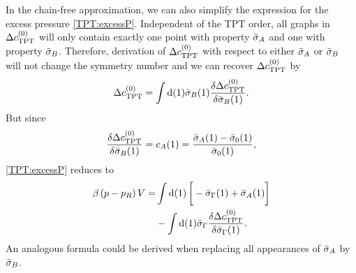 \documentclass[8.5pt,twoside,twocolumn]{article}
\newcommand\di{\te{d}}
\newcommand\inon{\enmat{\int\di(1)}}
\theoremstyle{standard}
\begin{document}
In the chain-free approximation, we can also simplify the expression for the
excess pressure \eqref{TPT:excessP}. Independent of the TPT order, all graphs in
$\Delta c^{(0)}_{\text{TPT}}$ will only contain exactly one point with property $\bar\sigma_A$ and one with
property $\bar\sigma_B$. Therefore, derivation of $\Delta c^{(0)}_{\text{TPT}}$ with respect to either $\bar\sigma_A$
or $\bar\sigma_B$ will not change the symmetry number and we can recover $\Delta c^{(0)}_{\text{TPT}}$ by
\begin{equation}
\dct=\inon \si_B(1) \delti{\dct}{\si_B(1)}.
\label{TPT:dctbyint}
\end{equation}
But since
\begin{equation}
\frac {\delta{\ensuremath{\Delta c^{(0)}}_{\text{TPT}}}} {\delta{\bar\sigma_B(1)}}=c_A(1)=\frac{\bar\sigma_A(1)-\bar\sigma_0(1)}{\bar\sigma_0(1)},
\label{TPT:dctbycA}
\end{equation}
\eqref{TPT:excessP} reduces to
\begin{equation}
\begin{aligned}
\be \rb{p-p_R}V =& \inon \lt[\vphantom{\frac 1 2}-\siga(1)+\si_A(1)\rt]\\
&- \inon\siga\delti{\dct}{\siga(1)}.
\end{aligned}
\label{TPT:excessP:short}
\end{equation}
An analogous formula could be derived when replacing all appearances of $\bar\sigma_A$
by $\bar\sigma_B$.
\end{document}

